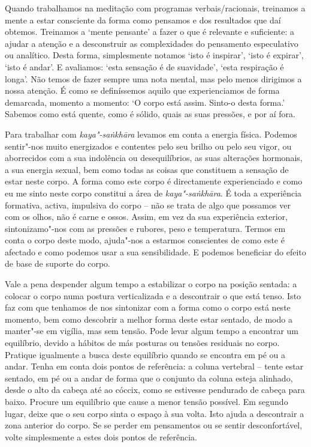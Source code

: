 Quando trabalhamos na meditação com programas verbais/racionais, treinamos a
mente a estar consciente da forma como pensamos e dos resultados que daí
obtemos. Treinamos a `mente pensante' a fazer o que é relevante e suficiente: a
ajudar a atenção e a desconstruir as complexidades do pensamento especulativo ou
analítico. Desta forma, simplesmente notamos `isto é inspirar', `isto é
expirar', `isto é andar'. E avaliamos: `esta sensação é de suavidade', `esta
respiração é longa'. Não temos de fazer sempre uma nota mental, mas pelo menos
dirigimos a nossa atenção. É como se definíssemos aquilo que experienciamos de
forma demarcada, momento a momento: `O corpo está assim. Sinto-o desta forma.'
Sabemos como está quente, como é sólido, quais as suas pressões, e por aí fora.

Para trabalhar com \emph{kaya"-saṅkhāra} levamos em conta a energia física.
Podemos sentir"-nos muito energizados e contentes pelo seu brilho ou pelo seu
vigor, ou aborrecidos com a sua indolência ou desequilíbrios, as suas alterações
hormonais, a sua energia sexual, bem como todas as coisas que constituem a
sensação de estar neste corpo. A forma como este corpo é directamente
experienciado e como eu me sinto neste corpo constitui a área de
\emph{kaya"-saṅkhāra}. É toda a experiência formativa, activa, impulsiva do corpo
-- não se trata de algo que possamos ver com os olhos, não é carne e ossos.
Assim, em vez da sua experiência exterior, sintonizamo"-nos com as pressões e
rubores, peso e temperatura. Termos em conta o corpo deste modo, ajuda"-nos a
estarmos conscientes de como este é afectado e como podemos usar a sua
sensibilidade. E podemos beneficiar do efeito de base de suporte do corpo.

\enlargethispage{\baselineskip}

Vale a pena despender algum tempo a estabilizar o corpo na posição sentada: a
colocar o corpo numa postura verticalizada e a descontrair o que está tenso.
Isto faz com que tenhamos de nos sintonizar com a forma como o corpo está neste
momento, bem como descobrir a melhor forma deste estar sentado, de modo a
manter"-se em vigília, mas sem tensão. Pode levar algum tempo a encontrar um
equilíbrio, devido a hábitos de más posturas ou tensões residuais no corpo.
Pratique igualmente a busca deste equilíbrio quando se encontra em pé ou a
andar. Tenha em conta dois pontos de referência: a coluna vertebral -- tente
estar sentado, em pé ou a andar de forma que o conjunto da coluna esteja
alinhado, desde o alto da cabeça até ao cóccix, como se estivesse pendurado de
cabeça para baixo. Procure um equilíbrio que cause a menor tensão possível. Em
segundo lugar, deixe que o seu corpo sinta o espaço à sua volta. Isto ajuda a
descontrair a zona anterior do corpo. Se se perder em pensamentos ou se sentir
desconfortável, volte simplesmente a estes dois pontos de referência.

